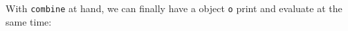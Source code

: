 With \lstinline{combine} at hand, we can finally have a object \lstinline{o}
print and evaluate at the same time:



\begin{comment}
which is of type
\lstinline{Exp}, to \lstinline{sub}, which expects a value of type
\lstinline{ExtExp}. This works precisely because \lstinline{Exp} is a
\textit{subtype} of \lstinline{ExtExp}. An acute reader by now may find an issue
about code reuse, i.e., we cannot reuse constructors! For example, the following
is rejected:
Instead, \lstinline{e3} should be written as follow:
Although, admittedly, creating expressions like this is slightly more
cumbersome. 
\end{comment}


\begin{comment}
The combinator is defined by the \lstinline{combine} trait, which takes two
algebras to create a combined algebra. It does so by appropriately delegating
behaviours in each component algebra to the combined algebra.


\bruno{Well, the previous subsection already introduces parametric
  polymorphism, so this discussion comes too late!}
Something new appears the above trait declaration. \name supports parametric
polymorphism. In \name, type variables use uppercase letters. Following the work
of~\citet{alpuimdisjoint}, \name uses an extension to universal quantification
called \textit{disjoint quantification}, where a type variable can be
constrained so that it is disjoint with a given type (\lstinline{B * A} for
example). Parametric polymorphism is need because \lstinline{combine} must
compose algebras with arbitrary type parameters. A disjointness constraint is
needed to ensure that two input algebras build values of disjoint types
(otherwise ambiguity could arise).
\end{comment}

\begin{comment}
\paragraph{Data constructors.} Using \lstinline{Exp} the two data constrcutors
are defined as follows:
\end{comment}

